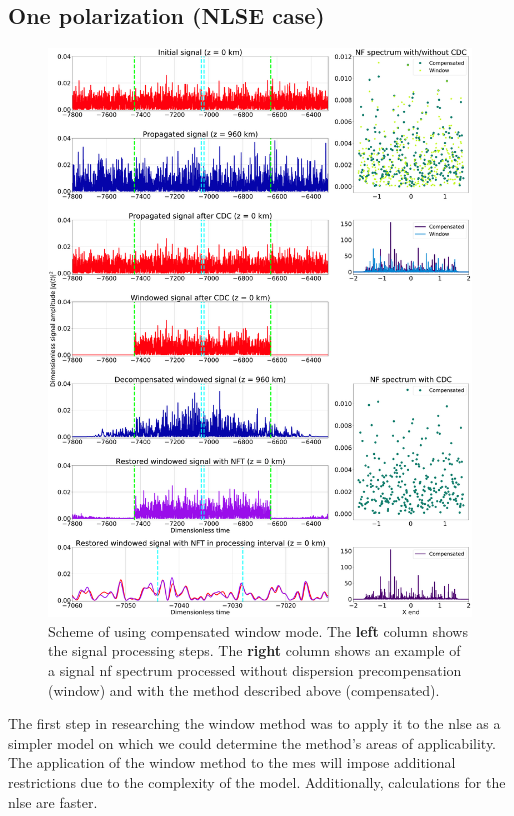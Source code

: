 \subsection{One polarization (NLSE case)}

\begin{figure}[tbp]
    \centering
        \includegraphics[width=0.95\linewidth]{images/window/nft_windowed_cdc_scheme.pdf}
    \caption{Scheme of using compensated window mode. The \textbf{left} column shows the signal processing steps. The \textbf{right} column shows an example of a signal \acrshort{nf} spectrum processed without dispersion precompensation (window) and with the method described above (compensated).}
    \label{fig:nft_windowed_scheme}
\end{figure}

The first step in researching the window method was to apply it to the \acrshort{nlse} as a simpler model on which we could determine the method's areas of applicability. The application of the window method to the \acrlong{me}s will impose additional restrictions due to the complexity of the model. Additionally, calculations for the \acrshort{nlse} are faster.

